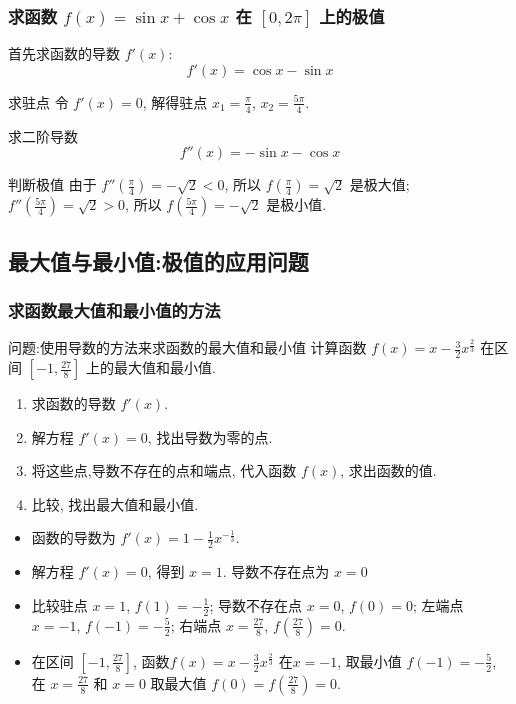 \documentclass[
10pt,
aspectratio=43,
]{beamer}
\begin{document}
\begin{frame}
	\frametitle{求函数 $f(x)=\sin x+\cos x$ 在 $[0,2 \pi]$ 上的极值}
	\everymath{\displaystyle}
	\begin{block}{}
		首先求函数的导数 $f'(x)$:
		\[ f'(x) = \cos x - \sin x \]
	\end{block}
	\pause
	\begin{block}{求驻点}
		令 $f'(x) = 0$, 解得驻点 $x_1 = \frac{\pi}{4}$, $x_2 = \frac{5\pi}{4}$.
	\end{block}
	\pause
	\begin{block}{求二阶导数}
		\[ f''(x) = -\sin x - \cos x \]
	\end{block}
	\pause
	\begin{block}{判断极值}
		由于 $f''\left(\frac{\pi}{4}\right) = -\sqrt{2} < 0$, 所以 $f\left(\frac{\pi}{4}\right) = \sqrt{2}$ 是极大值;
		$f''\left(\frac{5\pi}{4}\right) = \sqrt{2} > 0$, 所以 $f\left(\frac{5\pi}{4}\right) = -\sqrt{2}$ 是极小值.
	\end{block}
\end{frame}

\subsection{最大值与最小值:极值的应用问题}
\begin{frame}
	\frametitle{求函数最大值和最小值的方法}
	\begin{block}{问题:使用导数的方法来求函数的最大值和最小值}
		计算函数 $f(x)=x-\frac32x^{\frac23}$ 在区间 $[-1,\frac{27}{8}]$ 上的最大值和最小值.
	\end{block}
	\pause
	\begin{block}{}
		\begin{enumerate}
			\item 求函数的导数 $f'(x)$.
			      \pause
			\item 解方程 $f'(x)=0$, 找出导数为零的点.
			      \pause
			\item 将这些点,导数不存在的点和端点, 代入函数 $f(x)$, 求出函数的值.
			      \pause
			\item 比较, 找出最大值和最小值.
		\end{enumerate}
	\end{block}
	\pause
	\begin{block}{}
		\begin{itemize}
			\item 函数的导数为 $f'(x)=1-\frac12x^{-\frac13}$.
			      \pause
			\item 解方程 $f'(x)=0$, 得到 $x=1$. 导数不存在点为 $x=0$
			      \pause
			\item 比较驻点 $x=1$, $f(1)=-\frac12$; 导数不存在点 $x=0$, $f(0)=0$; 左端点 $x=-1$, $f(-1)=-\frac{5}{2}$; 右端点 $x=\frac{27}{8}$, $f(\frac{27}{8})=0$.
			      \pause
			\item 在区间 $[-1,\frac{27}{8}]$, 函数$f(x)=x-\frac32x^{\frac23}$ 在$x=-1$, 取最小值 $f(-1)=-\frac{5}{2}$, 在 $x=\frac{27}{8}$ 和 $x=0$ 取最大值 $f(0)=f(\frac{27}{8})=0$.
		\end{itemize}
	\end{block}
\end{frame}
\end{document}
